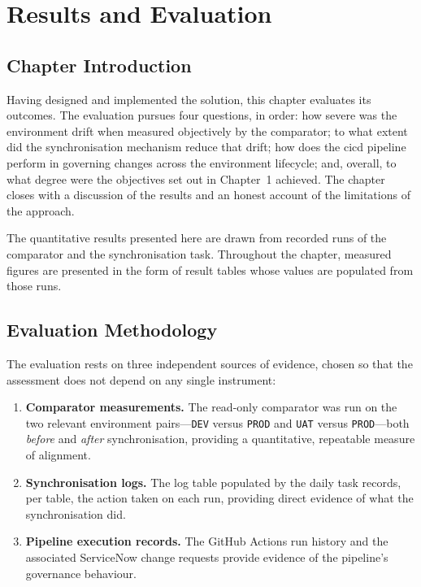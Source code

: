 %
%
\chapter{Results and Evaluation}
\label{chap:results}

\section*{Chapter Introduction}

Having designed and implemented the solution, this chapter evaluates its outcomes. The evaluation pursues four questions, in order: how severe was the environment drift when measured objectively by the comparator; to what extent did the synchronisation mechanism reduce that drift; how does the \gls{cicd} pipeline perform in governing changes across the environment lifecycle; and, overall, to what degree were the objectives set out in Chapter~1 achieved. The chapter closes with a discussion of the results and an honest account of the limitations of the approach.

The quantitative results presented here are drawn from recorded runs of the comparator and the synchronisation task. Throughout the chapter, measured figures are presented in the form of result tables whose values are populated from those runs.

\section{Evaluation Methodology}
\label{sec:eval-method}

The evaluation rests on three independent sources of evidence, chosen so that the assessment does not depend on any single instrument:

\begin{enumerate}
  \item \textbf{Comparator measurements.} The read-only comparator was run on the two relevant environment pairs---\texttt{DEV} versus \texttt{PROD} and \texttt{UAT} versus \texttt{PROD}---both \emph{before} and \emph{after} synchronisation, providing a quantitative, repeatable measure of alignment.
  \item \textbf{Synchronisation logs.} The log table populated by the daily task records, per table, the action taken on each run, providing direct evidence of what the synchronisation did.
  \item \textbf{Pipeline execution records.} The GitHub Actions run history and the associated ServiceNow change requests provide evidence of the pipeline's governance behaviour.
\end{enumerate}

